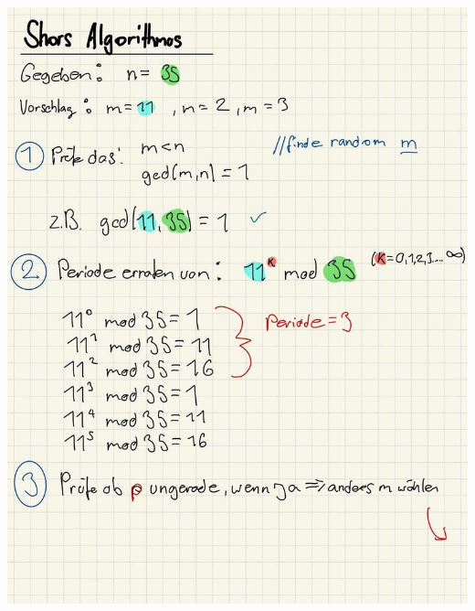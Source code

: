 \documentclass[11pt]{article}
\begin{document}
\begin{center}
	\includegraphics[scale=0.9]{img/shor1.jpg}\\
\end{center}

\break
\end{document}
